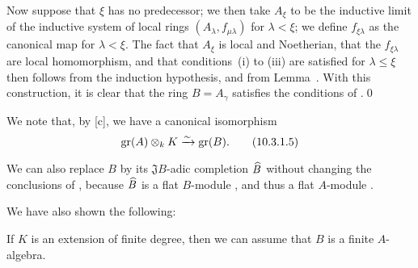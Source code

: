 \begin{env}[10.3.1.4]
Now suppose that $\xi$ has no predecessor;
we then take $A_\xi$ to be the inductive limit of the inductive system of local rings $(A_\lambda,f_{\mu\lambda})$ for $\lambda<\xi$;
we define $f_{\xi\lambda}$ as the canonical map for $\lambda<\xi$.
The fact that $A_\xi$ is local and Noetherian, that the $f_{\xi\lambda}$ are local homomorphism, and that conditions~(i) to (iii) are satisfied for $\lambda\leq\xi$
then follows from the induction hypothesis, and from Lemma~.
With this construction, it is clear that the ring $B=A_\gamma$ satisfies the conditions of .\qed
\end{env}

We note that, by [c], we have a canonical isomorphism
\[
\label{eq:0.10.3.1.5}
  \operatorname{gr}(A)\otimes_k K\xrightarrow{\sim}\operatorname{gr}(B).
  \tag{10.3.1.5}
\]

We can also replace $B$ by its $\mathfrak{J}B$-adic completion ${\widehat{B}}$ without changing the conclusions of , because ${\widehat{B}}$ is a flat $B$-module , and thus a flat $A$-module .

We have also shown the following:
\begin{corollary}[10.3.2]
\label{0.10.3.2}
If $K$ is an extension of finite degree, then we can assume that $B$ is a finite $A$-algebra.
\end{corollary}


